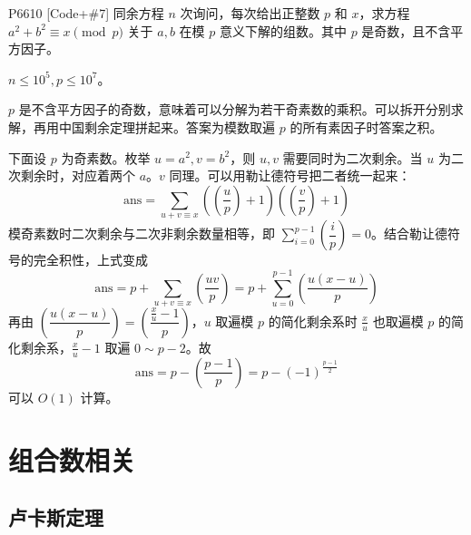 \documentclass [hyperref={bookmarksdepth=4}, aspectratio=169] {beamer}
\theoremstyle {fy}
\begin{document}
\begin{frame}{P6610 [Code+\#7] 同余方程}
$n$ 次询问，每次给出正整数 $p$ 和 $x$，求方程 $a^2+b^2\equiv x\pmod p$ 关于 $a,b$ 在模 $p$ 意义下解的组数。其中 $p$ 是奇数，且不含平方因子。

$n\le 10^5,p\le 10^7$。

$p$ 是不含平方因子的奇数，意味着可以分解为若干奇素数的乘积。可以拆开分别求解，再用中国剩余定理拼起来。答案为模数取遍 $p$ 的所有素因子时答案之积。

下面设 $p$ 为奇素数。枚举 $u=a^2,v=b^2$，则 $u,v$ 需要同时为二次剩余。当 $u$ 为二次剩余时，对应着两个 $a$。$v$ 同理。可以用勒让德符号把二者统一起来：
$$
\text{ans}=\sum_{u+v\equiv x}\left(\left(\frac{u}{p}\right)+1\right)\left(\left(\frac{v}{p}\right)+1 \right)
$$
模奇素数时二次剩余与二次非剩余数量相等，即 $\sum\limits_{i=0}^{p-1}\left(\dfrac{i}{p} \right)=0$。结合勒让德符号的完全积性，上式变成
$$
\text{ans}=p+\sum_{u+v\equiv x}\left(\frac{uv}{p}\right)=p+\sum_{u=0}^{p-1}\left(\frac{u(x-u)}{p}\right)
$$
再由 $\left(\dfrac{u(x-u)}{p}\right)=\left(\dfrac{\frac{x}{u}-1}{p}\right)$，$u$ 取遍模 $p$ 的简化剩余系时 $\frac{x}{u}$ 也取遍模 $p$ 的简化剩余系，$\frac{x}{u}-1$ 取遍 $0\sim p-2$。故
$$
\text{ans}=p-\left(\frac{p-1}{p}\right)=p-(-1)^{\frac{p-1}{2}}
$$
可以 $O(1)$ 计算。
\end{frame}

\section{组合数相关}

\subsection{卢卡斯定理}
\end{document}
